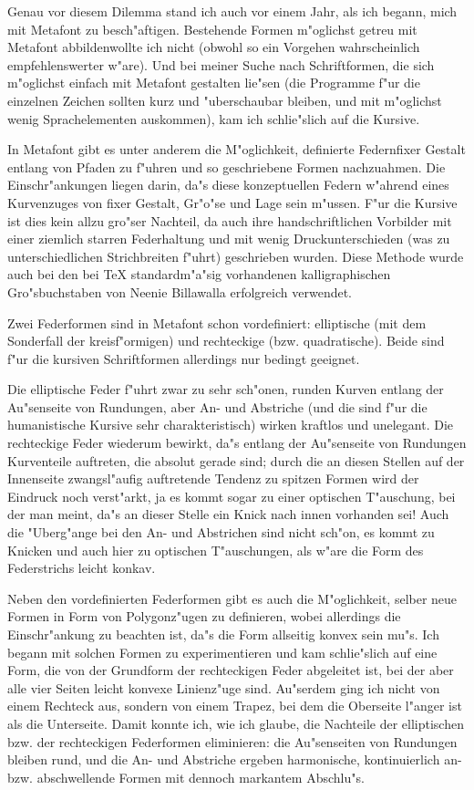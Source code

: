 \documentclass[draft,12pt,a4paper,german]{article}
\newcommand{\MF}{Metafont}
\begin{document}
Genau vor diesem Dilemma stand ich auch vor einem Jahr, als ich begann,
mich mit \MF{} zu besch"aftigen. Bestehende Formen m"oglichst getreu mit
\MF{} \glqq abbilden\grqq  wollte ich nicht (obwohl so ein Vorgehen
wahrscheinlich
empfehlenswerter w"are). Und bei meiner Suche nach Schriftformen, die sich
m"oglichst einfach mit \MF{} gestalten lie"sen (die Programme f"ur die
einzelnen Zeichen sollten kurz und "uberschaubar bleiben, und mit m"oglichst
wenig Sprachelementen auskommen), kam ich schlie"slich auf die
Kursive.

In \MF{} gibt es unter anderem die M"oglichkeit, definierte 
\glqq Federn\grqq  fixer
Gestalt entlang von Pfaden zu f"uhren und so geschriebene Formen nachzuahmen.
Die Einschr"ankungen liegen darin, da"s diese konzeptuellen Federn w"ahrend
eines
Kurvenzuges von fixer Gestalt, Gr"o"se und Lage sein m"ussen. F"ur die Kursive
ist dies kein allzu gro"ser Nachteil, da auch ihre handschriftlichen
Vorbilder mit einer ziemlich starren Federhaltung und mit wenig
Druckunterschieden (was zu unterschiedlichen Strichbreiten f"uhrt)
geschrieben wurden. Diese Methode wurde auch bei den bei \TeX{}
standardm"a"sig vorhandenen kalligraphischen Gro"sbuchstaben von Neenie
Billawalla erfolgreich verwendet.

Zwei Federformen sind in \MF{} schon vordefiniert: elliptische (mit dem
Sonderfall der kreisf"ormigen) und rechteckige (bzw. quadratische). Beide
sind f"ur die kursiven Schriftformen allerdings nur bedingt geeignet.

Die elliptische Feder f"uhrt zwar zu sehr sch"onen, runden Kurven entlang der
Au"senseite von Rundungen, aber An- und Abstriche (und die sind f"ur die
humanistische Kursive sehr charakteristisch) wirken kraftlos und unelegant. 
Die rechteckige Feder wiederum bewirkt, da"s entlang der Au"senseite von
Rundungen Kurventeile auftreten, die absolut gerade sind; durch die an
diesen Stellen auf der Innenseite zwangsl"aufig auftretende Tendenz zu
spitzen Formen wird der Eindruck noch verst"arkt, ja es kommt sogar zu einer
optischen T"auschung, bei der man meint, da"s an dieser Stelle ein Knick nach
innen vorhanden sei! Auch die "Uberg"ange bei den An- und Abstrichen sind nicht
sch"on, es kommt zu Knicken und auch hier zu optischen T"auschungen, als w"are
die Form des Federstrichs leicht konkav.

Neben den vordefinierten Federformen gibt es auch die M"oglichkeit, selber
neue Formen in Form von Polygonz"ugen zu definieren, wobei allerdings die
Einschr"ankung zu beachten ist, da"s die Form allseitig konvex sein mu"s. Ich
begann mit solchen Formen zu experimentieren und kam schlie"slich auf eine
Form, die von der Grundform der rechteckigen Feder abgeleitet ist, bei der aber
alle vier Seiten leicht konvexe Linienz"uge sind. Au"serdem ging ich nicht von
einem Rechteck aus, sondern von einem Trapez, bei dem die Oberseite l"anger
ist als die Unterseite. Damit konnte ich, wie ich glaube, die Nachteile der
elliptischen bzw. der rechteckigen Federformen eliminieren: die Au"senseiten
von Rundungen bleiben rund, und die An- und Abstriche ergeben harmonische,
kontinuierlich an- bzw. abschwellende Formen mit dennoch markantem Abschlu"s.
\end{document}
